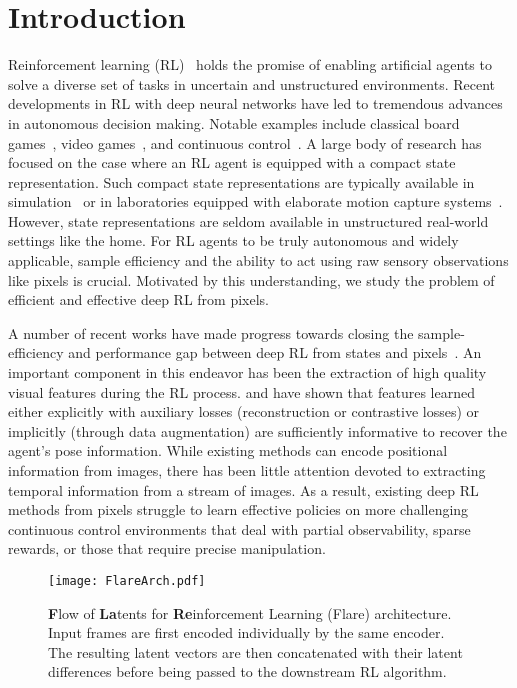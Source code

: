 \documentclass{article} \usepackage{iclr2021_conference,times}
\begin{document}
\section{Introduction}
Reinforcement learning (RL)~\citep{SuttonBook} holds the promise of enabling artificial agents to solve a diverse set of tasks in uncertain and unstructured environments. Recent developments in RL with deep neural networks have led to tremendous advances in autonomous decision making. Notable examples include classical board games~\citep{alphago, alphagozero}, video games~\citep{mnih2015human, openai2019dota, alphastar}, and continuous control~\citep{ppo, ddpg, DAPG}. A large body of research has focused on the case where an RL agent is equipped with a compact state representation. 
Such compact state representations are typically available in simulation~\citep{mujoco, tassa2018deepmind} or in laboratories equipped with elaborate motion capture systems~\citep{OpenAIHand, Zhu2019DexterousMW, Lowrey2018ReinforcementLF}. However, state representations are seldom available in unstructured real-world settings like the home. For RL agents to be truly autonomous and widely applicable, sample efficiency and the ability to act using raw sensory observations like pixels is crucial. Motivated by this understanding, we study the problem of efficient and effective deep RL from pixels.

A number of recent works have made progress towards closing the sample-efficiency and performance gap between deep RL from states and pixels~\citep{laskin_srinivas2020curl,laskin_lee2020rad,hafner2019dream,kostrikov2020image}. An important component in this endeavor has been the extraction of high quality visual features during the RL process. \citet{laskin_lee2020rad} and \citet{stooke2020atc} have shown that features learned either explicitly with auxiliary losses (reconstruction or contrastive losses) or implicitly (through data augmentation) are sufficiently informative to recover the agent's pose information. While existing methods can encode positional information from images, there has been little attention devoted to extracting temporal information from a stream of images. As a result, existing deep RL methods from pixels struggle to learn effective policies on more challenging continuous control environments that deal with partial observability, sparse rewards, or those that require precise manipulation.


 \begin{wrapfigure}{r}{0.5\textwidth}
     \centering
     \vspace{-5mm}
     \texttt{[image: FlareArch.pdf]}
     \vspace{-2mm}
     \small
     \caption{{\bf F}low of {\bf La}tents for {\bf Re}inforcement Learning (Flare) architecture. Input frames are first encoded individually by the same encoder. The resulting latent vectors are then concatenated with their latent differences before being passed to the downstream RL algorithm. }
    \vspace{-5mm}
     \label{fig:flare_intro}
 \end{wrapfigure}
 
\end{document}
